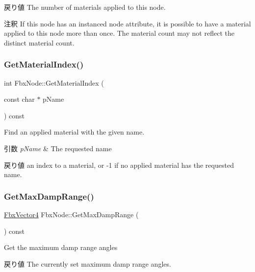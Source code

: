 \begin{DoxyReturn}{戻り値}
The number of materials applied to this node. 
\end{DoxyReturn}
\begin{DoxyRemark}{注釈}
If this node has an instanced node attribute, it is possible to have a material applied to this node more than once. The material count may not reflect the distinct material count. 
\end{DoxyRemark}
\mbox{\label{class_fbx_node_a9648447be5910defe6769a37f8610778}} 
\subsubsection{\texorpdfstring{Get\+Material\+Index()}{GetMaterialIndex()}}
{\footnotesize\ttfamily int Fbx\+Node\+::\+Get\+Material\+Index (\begin{DoxyParamCaption}\item[{const char $\ast$}]{p\+Name }\end{DoxyParamCaption}) const}

Find an applied material with the given name. 
\begin{DoxyParams}{引数}
{\em p\+Name} & The requested name \\
\hline
\end{DoxyParams}
\begin{DoxyReturn}{戻り値}
an index to a material, or -\/1 if no applied material has the requested name. 
\end{DoxyReturn}
\mbox{\label{class_fbx_node_ada06a2a32c895f850c45e86d8478fe54}} 
\subsubsection{\texorpdfstring{Get\+Max\+Damp\+Range()}{GetMaxDampRange()}}
{\footnotesize\ttfamily \hyperlink{class_fbx_vector4}{Fbx\+Vector4} Fbx\+Node\+::\+Get\+Max\+Damp\+Range (\begin{DoxyParamCaption}{ }\end{DoxyParamCaption}) const}

Get the maximum damp range angles \begin{DoxyReturn}{戻り値}
The currently set maximum damp range angles. 
\end{DoxyReturn}
\mbox{\label{class_fbx_node_a6290154866d9fdb5314457d58277fbbd}} 
